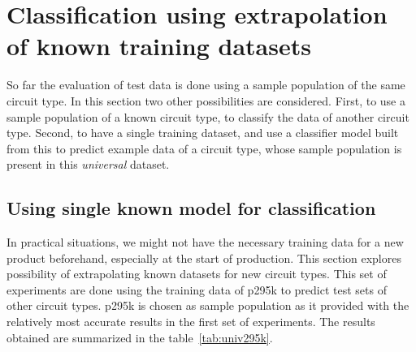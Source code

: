 \section{Classification using extrapolation of known training datasets}
So far the evaluation of test data is done using a sample population of the same circuit type. In this section two other possibilities are considered. First, to use a sample population of a known circuit type, to classify the data of another circuit type. Second, to have a single training dataset, and use a classifier model built from this to predict example data of a circuit type, whose sample population is present in this \emph{universal} dataset.

\subsection{Using single known model for classification}
In practical situations, we might not have the necessary training data for a new product beforehand, especially at the start of production. This section explores possibility of extrapolating known datasets for new circuit types. This set of experiments are done using the training data of p295k to predict test sets of other circuit types. p295k is chosen as sample population as it provided with the relatively most accurate results in the first set of experiments. The results obtained are summarized in the table~\ref{tab:univ295k}.

